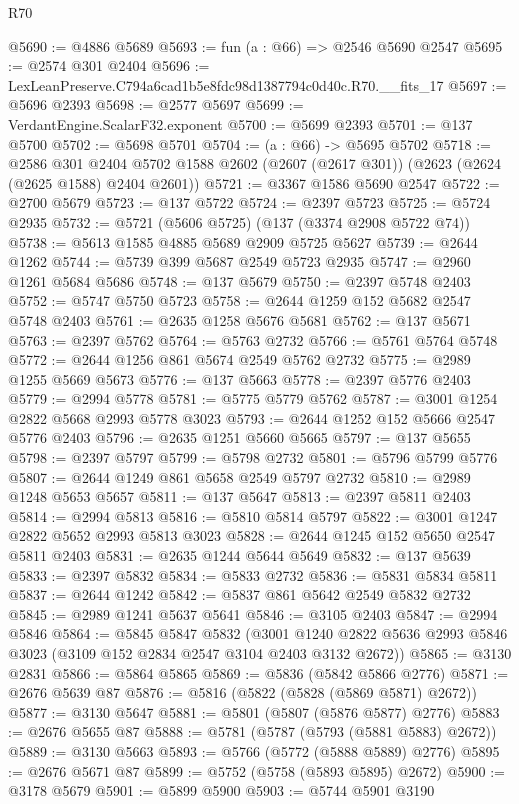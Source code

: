 \begin{lexlean}{R70}
\begin{coremodule}
@5690 := @4886 @5689
@5693 := fun (a : @66) => @2546 @5690 @2547
@5695 := @2574 @301 @2404
@5696 := LexLeanPreserve.C794a6cad1b5e8fdc98d1387794c0d40c.R70.__fits_17
@5697 := @5696 @2393
@5698 := @2577 @5697
@5699 := VerdantEngine.ScalarF32.exponent
@5700 := @5699 @2393
@5701 := @137 @5700
@5702 := @5698 @5701
@5704 := (a : @66) -> @5695 @5702
@5718 := @2586
    @301
    @2404
    @5702
    @1588
    @2602
    (@2607 (@2617 @301))
    (@2623 (@2624 (@2625 @1588) @2404 @2601))
@5721 := @3367 @1586 @5690 @2547
@5722 := @2700 @5679
@5723 := @137 @5722
@5724 := @2397 @5723
@5725 := @5724 @2935
@5732 := @5721 (@5606 @5725) (@137 (@3374 @2908 @5722 @74))
@5738 := @5613 @1585 @4885 @5689 @2909 @5725 @5627
@5739 := @2644 @1262
@5744 := @5739 @399 @5687 @2549 @5723 @2935
@5747 := @2960 @1261 @5684 @5686
@5748 := @137 @5679
@5750 := @2397 @5748 @2403
@5752 := @5747 @5750 @5723
@5758 := @2644 @1259 @152 @5682 @2547 @5748 @2403
@5761 := @2635 @1258 @5676 @5681
@5762 := @137 @5671
@5763 := @2397 @5762
@5764 := @5763 @2732
@5766 := @5761 @5764 @5748
@5772 := @2644 @1256 @861 @5674 @2549 @5762 @2732
@5775 := @2989 @1255 @5669 @5673
@5776 := @137 @5663
@5778 := @2397 @5776 @2403
@5779 := @2994 @5778
@5781 := @5775 @5779 @5762
@5787 := @3001 @1254 @2822 @5668 @2993 @5778 @3023
@5793 := @2644 @1252 @152 @5666 @2547 @5776 @2403
@5796 := @2635 @1251 @5660 @5665
@5797 := @137 @5655
@5798 := @2397 @5797
@5799 := @5798 @2732
@5801 := @5796 @5799 @5776
@5807 := @2644 @1249 @861 @5658 @2549 @5797 @2732
@5810 := @2989 @1248 @5653 @5657
@5811 := @137 @5647
@5813 := @2397 @5811 @2403
@5814 := @2994 @5813
@5816 := @5810 @5814 @5797
@5822 := @3001 @1247 @2822 @5652 @2993 @5813 @3023
@5828 := @2644 @1245 @152 @5650 @2547 @5811 @2403
@5831 := @2635 @1244 @5644 @5649
@5832 := @137 @5639
@5833 := @2397 @5832
@5834 := @5833 @2732
@5836 := @5831 @5834 @5811
@5837 := @2644 @1242
@5842 := @5837 @861 @5642 @2549 @5832 @2732
@5845 := @2989 @1241 @5637 @5641
@5846 := @3105 @2403
@5847 := @2994 @5846
@5864 := @5845
    @5847
    @5832
    (@3001 @1240 @2822 @5636 @2993 @5846 @3023 (@3109 @152 @2834 @2547 @3104 @2403 @3132 @2672))
@5865 := @3130 @2831
@5866 := @5864 @5865
@5869 := @5836 (@5842 @5866 @2776)
@5871 := @2676 @5639 @87
@5876 := @5816 (@5822 (@5828 (@5869 @5871) @2672))
@5877 := @3130 @5647
@5881 := @5801 (@5807 (@5876 @5877) @2776)
@5883 := @2676 @5655 @87
@5888 := @5781 (@5787 (@5793 (@5881 @5883) @2672))
@5889 := @3130 @5663
@5893 := @5766 (@5772 (@5888 @5889) @2776)
@5895 := @2676 @5671 @87
@5899 := @5752 (@5758 (@5893 @5895) @2672)
@5900 := @3178 @5679
@5901 := @5899 @5900
@5903 := @5744 @5901 @3190

\end{coremodule}
\end{lexlean}
